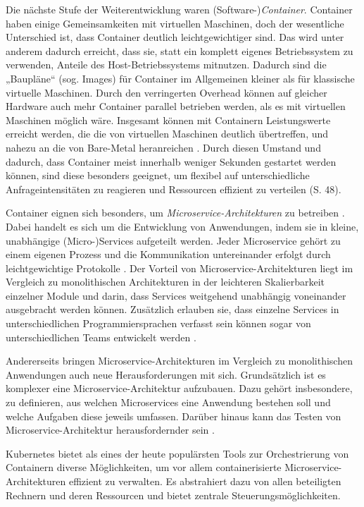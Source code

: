 \documentclass[11pt,a4paper]{article}
\begin{document}
Die nächste Stufe der Weiterentwicklung waren (Software-)\emph{Container}. Container haben einige Gemeinsamkeiten mit virtuellen Maschinen, doch der wesentliche Unterschied ist,
dass Container deutlich leichtgewichtiger sind. Das wird unter anderem dadurch erreicht, dass sie, statt ein komplett eigenes Betriebssystem zu verwenden,
Anteile des Host-Betriebssystems mitnutzen. Dadurch sind die „Baupläne“ (sog. Images) für Container im Allgemeinen kleiner als für klassische virtuelle Maschinen.
Durch den verringerten Overhead können auf gleicher Hardware auch mehr Container parallel betrieben werden, als es mit virtuellen Maschinen möglich wäre.
Insgesamt können mit Containern Leistungswerte erreicht werden, die die von virtuellen Maschinen deutlich übertreffen,
und nahezu an die von Bare-Metal heranreichen \cite{10.1145/1272998.1273025}.
Durch diesen Umstand und dadurch, dass Container meist innerhalb weniger Sekunden gestartet werden können, sind diese besonders geeignet,
um flexibel auf unterschiedliche Anfrageintensitäten zu reagieren und Ressourcen effizient zu verteilen \cite{kofler2021docker} (S. 48).

Container eignen sich besonders, um \emph{Microservice-Architekturen} zu betreiben \cite{7158965}. Dabei handelt es sich um die
Entwicklung von Anwendungen, indem sie in kleine, unabhängige (Micro-)Services aufgeteilt werden. Jeder Microservice gehört zu
einem eigenen Prozess und die Kommunikation untereinander erfolgt durch leichtgewichtige Protokolle \cite{8406008}.
Der Vorteil von Microservice-Architekturen liegt im Vergleich zu monolithischen Architekturen in der
leichteren Skalierbarkeit einzelner Module und darin, dass Services weitgehend unabhängig voneinander
ausgebracht werden können. Zusätzlich erlauben sie, dass einzelne Services in unterschiedlichen Programmiersprachen
verfasst sein können sogar von unterschiedlichen Teams entwickelt werden \cite{microservices}.

Andererseits bringen Microservice-Architekturen im Vergleich zu monolithischen Anwendungen
auch neue Herausforderungen mit sich.
Grundsätzlich ist es komplexer eine Microservice-Architektur aufzubauen.
Dazu gehört insbesondere, zu definieren, aus welchen Microservices eine Anwendung bestehen soll
und welche Aufgaben diese jeweils umfassen. Darüber hinaus kann das Testen von Microservice-Architektur
herausfordernder sein \cite{8406008}.

Kubernetes bietet als eines der heute populärsten Tools zur Orchestrierung von Containern
diverse Möglichkeiten, um vor allem containerisierte Microservice-Architekturen effizient zu verwalten.
Es abstrahiert dazu von allen beteiligten Rechnern und deren Ressourcen und bietet zentrale Steuerungsmöglichkeiten.
\cite{Pagani_2019} %
\end{document}
